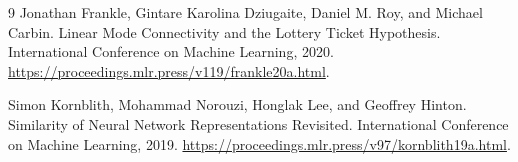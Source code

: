\documentclass[11pt]{article}
\begin{document}
\begin{thebibliography}{9}
Jonathan Frankle, Gintare Karolina Dziugaite, Daniel M. Roy, and Michael Carbin.
\newblock Linear Mode Connectivity and the Lottery Ticket Hypothesis.
\newblock International Conference on Machine Learning, 2020.
\newblock \url{https://proceedings.mlr.press/v119/frankle20a.html}.

Simon Kornblith, Mohammad Norouzi, Honglak Lee, and Geoffrey Hinton.
\newblock Similarity of Neural Network Representations Revisited.
\newblock International Conference on Machine Learning, 2019.
\newblock \url{https://proceedings.mlr.press/v97/kornblith19a.html}.

\end{thebibliography}
\end{document}
